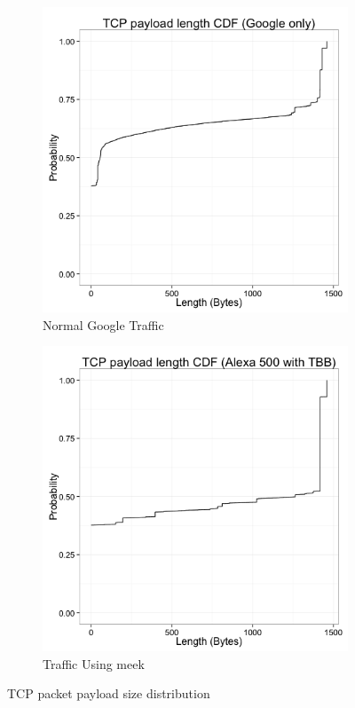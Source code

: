 \documentclass[conference]{IEEEtran}
\begin{document}
\begin{figure}
\centering
\begin{subfigure}[b]{0.5\textwidth}
\includegraphics[width=\textwidth]{figs/datalen-google-cdf.png}
\caption{Normal Google Traffic}
\label{fig:len:lbl}
\end{subfigure}%
\begin{subfigure}[b]{0.5\textwidth}
\includegraphics[width=\textwidth]{figs/datalen-tbb-cdf.png}
\caption{Traffic Using meek}
\label{fig:len:meek}
\end{subfigure}

\caption{TCP packet payload size distribution}
\label{fig:len}
\end{figure}
\end{document}
